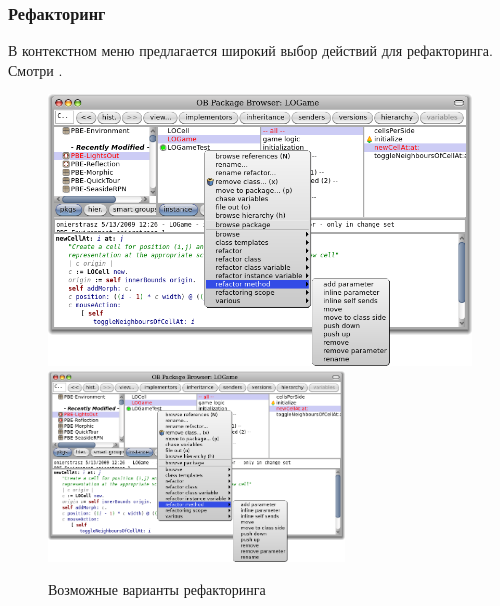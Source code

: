 \documentclass[a4paper,10pt,twoside]{book}
\begin{document}
\subsubsection{Рефакторинг}


В контекстном меню предлагается широкий выбор действий для рефакторинга. Смотри .

\begin{figure}[btp]
	\begin{center}
	\ifluluelse
		{\includegraphics[width=\textwidth]{refactoring}}
		{\includegraphics[width=0.7\textwidth]{refactoring}}
	\end{center}
	\caption{Возможные варианты рефакторинга}
\end{figure}

\end{document}
